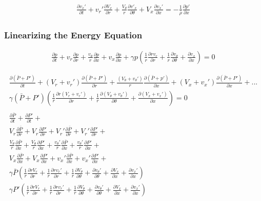 \documentclass[12pt]{article}
\begin{document}
\begin{align*}
\boxed{
	\frac{\partial  v_x' }{\partial t} +
	v_r' \frac{\partial  V_x  }{\partial r} +
	\frac{V_{\theta}}{r} \frac{\partial v'_x}{\partial \theta} +
	V_x \frac{\partial v_x'}{\partial x} 
	= -\frac{1    }{\bar{\rho}}  \frac{\partial p'}{\partial x} 
}
\end{align*}

\newpage

\subsubsection{Linearizing the Energy Equation}
\begin{align*}
\frac{\partial p}{\partial t} + v_r \frac{\partial p}{\partial r} + \frac{v_{\theta}}{r}\frac{\partial p}{\partial x} + v_x \frac{\partial p}{\partial x} 
+ \gamma p \left(\frac{1}{r} \frac{\partial r v_r}{\partial r} + \frac{1}{r} \frac{\partial v_{\theta}}{\partial \theta} + \frac{\partial v_x}{\partial x}\right) = 0
\end{align*}

\begin{align*}
\frac{\partial (\bar{P}+P')}{\partial t} + 
(V_r + v_r')
\frac{ \partial (\bar{P}+P')}{\partial r} + 
\frac{  (V_{\theta} + v_{\theta}') }{r}\frac{\partial (\bar{ P} +p') }{\partial x} + 
(V_x + v_x') 
\frac{\partial  (\bar{P}+P')}{\partial x} + ...\\
\gamma (\bar{P}+P') 
\left(
\frac{1}{r} \frac{\partial r (V_r + v_r')}{\partial r} + 
\frac{1}{r} \frac{\partial   (V_{\theta} + v_{\theta}')}{\partial \theta} + 
\frac{\partial (V_x + v_x')}{\partial x}
\right) = 0  	\\
\\
\frac{\partial \bar{P} }{\partial t} +
\frac{\partial      P' }{\partial t} +\\
V_r  \frac{\partial \bar{P}}{\partial r} + 
V_r  \frac{\partial    P'}{\partial r} + 
V_r' \frac{\partial \bar{P}}{\partial r} + 
V_r' \frac{\partial      P'}{\partial r} + \\     
\frac{V_{\theta}}{r} \frac{\partial \bar{ P}}{\partial x} + 
\frac{V_{\theta}}{r} \frac{\partial       P'}{\partial x} +
\frac{v_{\theta}'}{r} \frac{\partial \bar{ P}}{\partial x} + 
\frac{v_{\theta}'}{r} \frac{\partial       P'}{\partial x} + \\
V_x  \frac{\partial \bar{P}}{\partial x} + 
V_x  \frac{\partial    P'}{\partial x} + 
v_x' \frac{\partial \bar{P}}{\partial x} + 
v_x' \frac{\partial      P'}{\partial x} + \\ 
\gamma \bar{ P}  \left(
\frac{1}{r} \frac{\partial r V_r}{\partial r} + 
\frac{1}{r} \frac{\partial r v_r'}{\partial r} +
\frac{1}{r} \frac{\partial V_{\theta}}{\partial \theta} + 
\frac{\partial v_{\theta}'}{\partial \theta}+ 
\frac{\partial V_x}{\partial x} + 
\frac{\partial v_x'}{\partial x} 
\right) \\
\gamma P' \left(
\frac{1}{r} \frac{\partial r V_r}{\partial r} + 
\frac{1}{r} \frac{\partial r v_r'}{\partial r} + 
\frac{1}{r} \frac{\partial V_{\theta}}{\partial \theta} + 
\frac{\partial v_{\theta}'}{\partial \theta}+ \frac{\partial V_x}{\partial x} +
\frac{\partial v_x'}{\partial x}\right) 
\end{align*}
\end{document}
